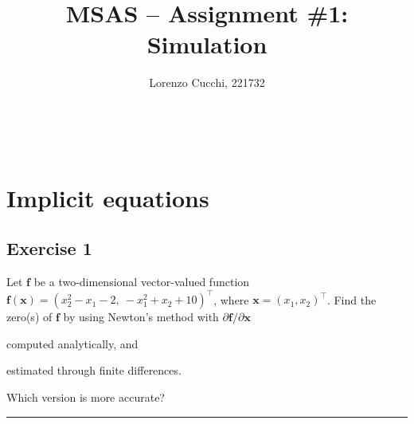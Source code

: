 \documentclass[11pt,a4paper,oneside]{article}
\title{MSAS -- Assignment \#1: Simulation} %
\author{\large {Lorenzo Cucchi}, {221732}}
\date{}
\makeatletter
\renewcommand{\vec}[1]{\mathbf{#1}}
\newcommand\headlinecolor{\normalcolor}
\renewcommand*\maketitle{%
    \begingroup
    \centering
    \fontsize{15}{15}%
    \selectfont
    \headlinecolor
    \@title\\
    \vspace{5mm}
    \@author
    \par
    \vskip1in
    \endgroup
    \vspace{-22mm}
}
\makeatother
\begin{document}
\maketitle

\thispagestyle{fancy}

\section{Implicit equations}

\subsection*{Exercise 1}

Let $\vec{f}$ be a two-dimensional vector-valued function $\vec{f}(\vec{x}) = (x_2^2-x_1-2, \ -x_1^2+x_2+10)^\top$, where $\vec{x} = (x_1, x_2)^\top$. Find the zero(s) of $\vec{f}$ by using Newton's method with $\partial\vec f/\partial\vec x$ 
\begin{enumerate*}[label=\arabic*)]
    \item computed analytically, and
    \item estimated through finite differences.
\end{enumerate*}
Which version is more accurate?

\medskip  \hrule \medskip
\end{document}
